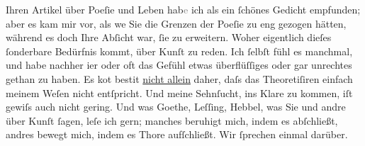 \pstart
           Ihren Artikel über Poeſie und
                  Leben hab\textcolor{gray}{e} ich als ein ſchönes Gedicht empfunden; aber es
               kam mir vor, als we{\geminationn} Sie die Grenzen der Poeſie zu eng
               gezogen hätten, während es doch Ihre Abſicht war, ſie zu erweitern. Woher eigentlich
               dieſes ſonderbare Bedürfnis kommt, über Kunſt zu reden. Ich ſelbſt fühl es manchmal,
               und {\pb}habe nachher i{\geminationm}er oder
               oft das Gefühl etwas überflüſſiges oder gar unrechtes gethan \introOben{}zu\introOben{} haben. Es ko{\geminationm}t besti{\geminationm}t \uline{nicht allein} daher,
               daſs das Theoretiſiren einfach meinem Weſen nicht entſpricht. Und meine Sehnſucht,
               ins Klare zu kommen, iſt gewiſs auch nicht gering. Und was Goethe, Leſſing, Hebbel, was Sie und andre über Kunſt ſagen, leſe
               ich gern; manches beruhigt mich, indem es abſchließt, andres bewegt {\pb}mich, indem es Thore aufſchließt. Wir ſprechen einmal
               darüber.\pend
           
